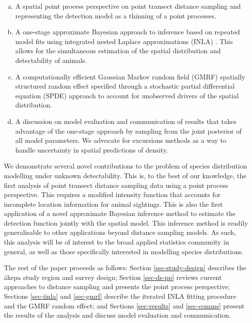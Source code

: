 \documentclass{stylefile16/statsoc}
\newcommand{\akepa}{\textquotesingle\={a}kepa}  %
\begin{document}
\begin{enumerate}[(a)]
	\item A spatial point process perspective on point transect distance sampling and representing the detection model as a thinning of a point processes.
	\item A one-stage approximate Bayesian approach to inference based on repeated model fits using integrated nested Laplace approximations (INLA) \citep{rue_approximate_2009}.  This allows for the simultaneous estimation of the spatial distribution and detectability of animals.
	\item A computationally efficient Gaussian Markov random field (GMRF) spatially structured random effect specified through a stochastic partial differential equation (SPDE) approach \citep{lindgren_explicit_2011} to account for unobserved drivers of the spatial distribution.
	\item A discussion on model evaluation and communication of results that takes advantage of the one-stage approach by sampling from the joint posterior of all model parameters. We advocate for excursions methods \citep{bolin_excursion_2015} as a way to handle uncertainty in spatial predictions of density.  
\end{enumerate}

We demonstrate several novel contributions to the problem of species distribution modelling under unknown detectability.  This is, to the best of our knowledge, the first analysis of point transect distance sampling data using a point process perspective.  This requires a modified intensity function that accounts for incomplete location information for animal sightings.  This is also the first application of a novel approximate Bayesian inference method to estimate the detection function jointly with the spatial model.  This inference method is readily generalisable to other applications beyond distance sampling models.  As such, this analysis will be of interest to the broad applied statistics community in general, as well as those specifically interested in modelling species distributions.

The rest of the paper proceeds as follows:  Section \ref{sec-study-design} describes the \akepa{} study region and survey design; Section \ref{sec-ds-pp} reviews current approaches to distance sampling and presents the point process perspective; Sections \ref{sec-iinla} and \ref{sec-gmrf} describe the iterated INLA fitting procedure and the GMRF random effect; and Sections \ref{sec-results} and \ref{sec-comms} present the results of the analysis and discuss model evaluation and communication.
\end{document}
